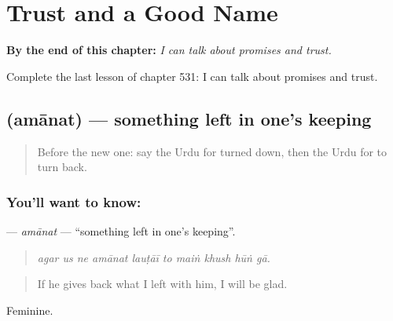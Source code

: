 
\chapter{Trust and a Good Name}
\label{ch:ur-trust-and-a-good-name}

\begin{chapteropening}
\textbf{By the end of this chapter:} \emph{I can talk about promises and trust.}

Complete the last lesson of chapter 531: I can talk about promises and trust.
\end{chapteropening}

\section[\texorpdfstring{\ur{امانت} (amānat)}{امانت (amānat)}]{ (amānat) — something left in one's keeping}

\label{lesson:UR-C531-amanat}



\begin{quote}
Before the new one: say the Urdu for turned down, then the Urdu for to turn back.
\end{quote}

\subsection*{You'll want to know: }
\textbf{} — \emph{amānat} — \textquotedblleft{}something left in one's keeping\textquotedblright{}.

\begin{quote}
         
\end{quote}

\begin{quote}
\emph{agar us ne amānat lauṭāī to maiṅ khush hūṅ gā.}
\end{quote}

\begin{quote}
If he gives back what I left with him, I will be glad.
\end{quote}

Feminine.

